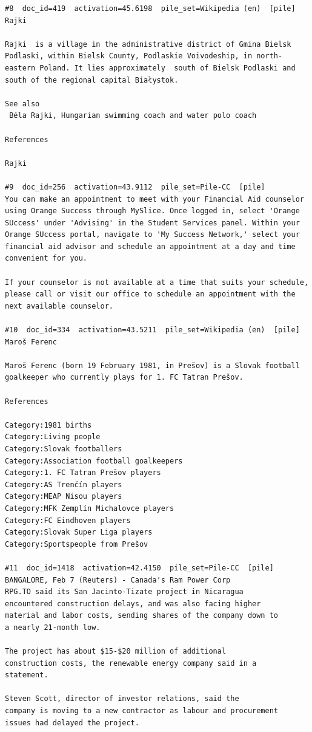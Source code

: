 \begin{verbatim}
#8  doc_id=419  activation=45.6198  pile_set=Wikipedia (en)  [pile]
Rajki

Rajki  is a village in the administrative district of Gmina Bielsk Podlaski, within Bielsk County, Podlaskie Voivodeship, in north-eastern Poland. It lies approximately  south of Bielsk Podlaski and  south of the regional capital Białystok.

See also
 Béla Rajki, Hungarian swimming coach and water polo coach

References

Rajki

#9  doc_id=256  activation=43.9112  pile_set=Pile-CC  [pile]
You can make an appointment to meet with your Financial Aid counselor using Orange Success through MySlice. Once logged in, select 'Orange SUccess' under 'Advising' in the Student Services panel. Within your Orange SUccess portal, navigate to 'My Success Network,' select your financial aid advisor and schedule an appointment at a day and time convenient for you.

If your counselor is not available at a time that suits your schedule, please call or visit our office to schedule an appointment with the next available counselor.

#10  doc_id=334  activation=43.5211  pile_set=Wikipedia (en)  [pile]
Maroš Ferenc

Maroš Ferenc (born 19 February 1981, in Prešov) is a Slovak football goalkeeper who currently plays for 1. FC Tatran Prešov.

References

Category:1981 births
Category:Living people
Category:Slovak footballers
Category:Association football goalkeepers
Category:1. FC Tatran Prešov players
Category:AS Trenčín players
Category:MEAP Nisou players
Category:MFK Zemplín Michalovce players
Category:FC Eindhoven players
Category:Slovak Super Liga players
Category:Sportspeople from Prešov

#11  doc_id=1418  activation=42.4150  pile_set=Pile-CC  [pile]
BANGALORE, Feb 7 (Reuters) - Canada's Ram Power Corp
RPG.TO said its San Jacinto-Tizate project in Nicaragua
encountered construction delays, and was also facing higher
material and labor costs, sending shares of the company down to
a nearly 21-month low.

The project has about $15-$20 million of additional
construction costs, the renewable energy company said in a
statement.

Steven Scott, director of investor relations, said the
company is moving to a new contractor as labour and procurement
issues had delayed the project.


\end{verbatim}
